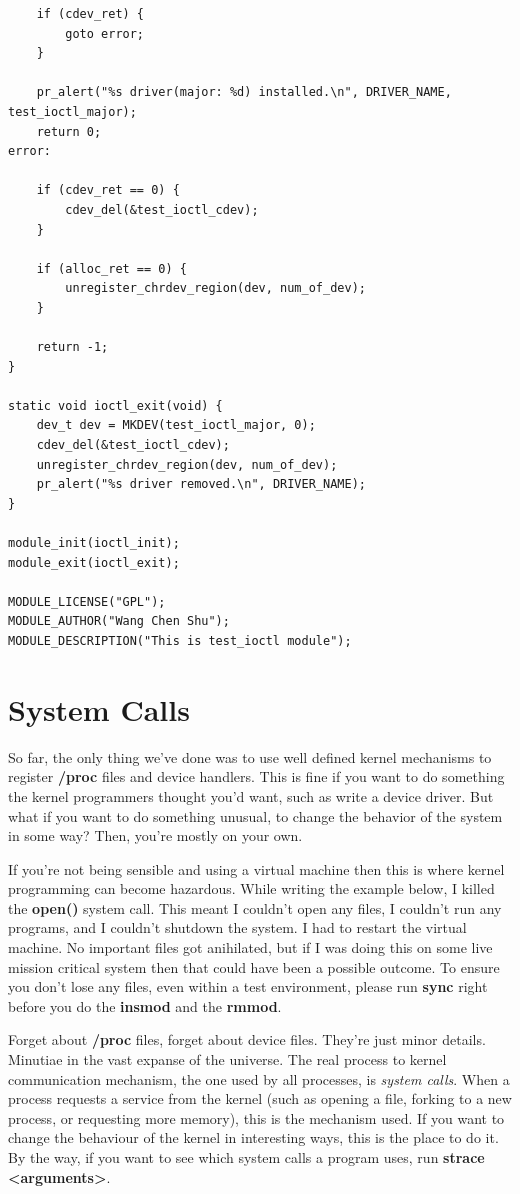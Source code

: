 \documentclass[11pt]{article}
\begin{document}
\begin{verbatim}
    if (cdev_ret) {
        goto error;
    }

    pr_alert("%s driver(major: %d) installed.\n", DRIVER_NAME, test_ioctl_major);
    return 0;
error:

    if (cdev_ret == 0) {
        cdev_del(&test_ioctl_cdev);
    }

    if (alloc_ret == 0) {
        unregister_chrdev_region(dev, num_of_dev);
    }

    return -1;
}

static void ioctl_exit(void) {
    dev_t dev = MKDEV(test_ioctl_major, 0);
    cdev_del(&test_ioctl_cdev);
    unregister_chrdev_region(dev, num_of_dev);
    pr_alert("%s driver removed.\n", DRIVER_NAME);
}

module_init(ioctl_init);
module_exit(ioctl_exit);

MODULE_LICENSE("GPL");
MODULE_AUTHOR("Wang Chen Shu");
MODULE_DESCRIPTION("This is test_ioctl module");
\end{verbatim}

\section*{System Calls}
\label{sec-10}
So far, the only thing we've done was to use well defined kernel mechanisms to register \textbf{/proc} files and device handlers. This is fine if you want to do something the kernel programmers thought you'd want, such as write a device driver. But what if you want to do something unusual, to change the behavior of the system in some way? Then, you're mostly on your own.

If you're not being sensible and using a virtual machine then this is where kernel programming can become hazardous. While writing the example below, I killed the \textbf{open()} system call. This meant I couldn't open any files, I couldn't run any programs, and I couldn't shutdown the system. I had to restart the virtual machine. No important files got anihilated, but if I was doing this on some live mission critical system then that could have been a possible outcome. To ensure you don't lose any files, even within a test environment, please run \textbf{sync} right before you do the \textbf{insmod} and the \textbf{rmmod}.

Forget about \textbf{/proc} files, forget about device files. They're just minor details. Minutiae in the vast expanse of the universe. The real process to kernel communication mechanism, the one used by all processes, is \emph{system calls}. When a process requests a service from the kernel (such as opening a file, forking to a new process, or requesting more memory), this is the mechanism used. If you want to change the behaviour of the kernel in interesting ways, this is the place to do it. By the way, if you want to see which system calls a program uses, run \textbf{strace <arguments>}.
\end{document}
